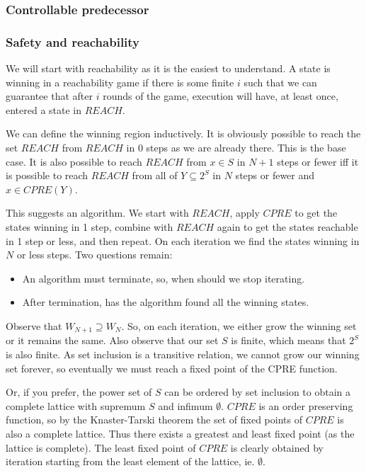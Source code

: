 \documentclass{article}
\begin{document}
\subsubsection{Controllable predecessor}

\subsubsection{Safety and reachability}

We will start with reachability as it is the easiest to understand. A state is winning in a reachability game if there is some finite $i$ such that we can guarantee that after $i$ rounds of the game, execution will have, at least once, entered a state in $REACH$.

We can define the winning region inductively. It is obviously possible to reach the set $REACH$ from $REACH$ in 0 steps as we are already there. This is the base case. It is also possible to reach $REACH$ from $x \in S$ in $N + 1$ steps or fewer iff it is possible to reach $REACH$ from all of $Y \subseteq 2^S$ in $N$ steps or fewer and $x \in CPRE(Y)$.

This suggests an algorithm. We start with $REACH$, apply $CPRE$ to get the states winning in 1 step, combine with $REACH$ again to get the states reachable in 1 step or less, and then repeat. On each iteration we find the states winning in $N$ or less steps. Two questions remain: 

\begin{itemize}
    \item An algorithm must terminate, so, when should we stop iterating.
    \item After termination, has the algorithm found all the winning states. 
\end{itemize}

Observe that $W_{N+1} \supseteq W_N$. So, on each iteration, we either grow the winning set or it remains the same. Also observe that our set $S$ is finite, which means that $2^S$ is also finite. As set inclusion is a transitive relation, we cannot grow our winning set forever, so eventually we must reach a fixed point of the CPRE function. 

Or, if you prefer, the power set of $S$ can be ordered by set inclusion to obtain a complete lattice with supremum $S$ and infimum $\emptyset$. $CPRE$ is an order preserving function, so by the Knaster-Tarski theorem the set of fixed points of $CPRE$ is also a complete lattice. Thus there exists a greatest and least fixed point (as the lattice is complete). The least fixed point of $CPRE$ is clearly obtained by iteration starting from the least element of the lattice, ie. $\emptyset$.
\end{document}
